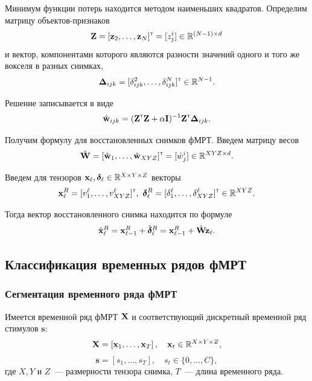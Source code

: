 Минимум функции потерь находится методом наименьших квадратов. Определим матрицу объектов-признаков
\begin{equation*}
	\label{eq10}
	\mathbf{Z} = [\mathbf{z}_2, \ldots, \mathbf{z}_N]^{\text{\tiny\sffamily\upshape\mdseries T}} = [z^i_j] \in \mathbb{R}^{(N-1) \times d}
\end{equation*}
и вектор, компонентами которого являются разности значений одного и того же вокселя в разных снимках,
\begin{equation*}
	\label{eq11}
	\mathbf{\Delta}_{ijk} = [\delta^2_{ijk}, \ldots, \delta^N_{ijk}]^{\text{\tiny\sffamily\upshape\mdseries T}} \in \mathbb{R}^{N-1}.
\end{equation*}

Решение записывается в виде
\begin{equation*}
	\label{eq12}
	\hat{\mathbf{w}}_{ijk} = (\mathbf{Z}^{\text{\tiny\sffamily\upshape\mdseries T}} \mathbf{Z} + \alpha \mathbf{I})^{-1} \mathbf{Z}^{\text{\tiny\sffamily\upshape\mdseries T}} \mathbf{\Delta}_{ijk}.
\end{equation*}

Получим формулу для восстановленных снимков фМРТ. Введем матрицу весов
\begin{equation*}
	\label{eq13}
	\hat{\mathbf{W}} = [\hat{\mathbf{w}}_1, \ldots, \hat{\mathbf{w}}_{XYZ}]^{\text{\tiny\sffamily\upshape\mdseries T}} = [\hat{w}^i_j] \in \mathbb{R}^{XYZ \times d}.
\end{equation*}

Введем для тензоров $\mathbf{x}_{\ell}, \boldsymbol{\delta}_{\ell} \in \mathbb{R}^{X \times Y \times Z}$ векторы
\[ \mathbf{x}_{\ell}^{R} = [ v^{\ell}_1, \ldots, v^{\ell}_{XYZ} ]^{\text{\tiny\sffamily\upshape\mdseries T}},\
	\boldsymbol{\delta}_{\ell}^{R} = [ \delta^{\ell}_1, \ldots, \delta^{\ell}_{XYZ} ]^{\text{\tiny\sffamily\upshape\mdseries T}} \in \mathbb{R}^{XYZ}. \]

Тогда вектор восстановленного снимка находится по формуле
\begin{equation*}
	\label{eq14}
	\hat{\mathbf{x}}_{\ell}^{R} = \mathbf{x}_{\ell-1}^{R} + \hat{\boldsymbol{\delta}}_{\ell}^{R} = \mathbf{x}_{\ell-1}^{R} + \hat{\mathbf{W}} \mathbf{z}_{\ell}.
\end{equation*}

\subsection{Классификация временных рядов фМРТ}
\subsubsection{Сегментация временного ряда фМРТ}\label{segmentation}
Имеется временной ряд фМРТ $\mathbf{X}$ и соответствующий дискретный временной ряд стимулов $\bm{s}$:
\begin{equation*}
\mathbf{X} = \left[\mathbf{x}_{1}, \ldots, \mathbf{x}_{T}\right], \quad \mathbf{x}_{t} \in \mathbb{R}^{X \times Y \times Z},
\end{equation*}
\begin{equation*}
\bm{s} = \left[{s}_{1}, \ldots, {s}_{T}\right], \quad {s}_{t} \in \{0,\dots, C\},
\end{equation*}
где $X, Y$ и $Z$~--- размерности тензора снимка, $T$~--- длина временного ряда. 

